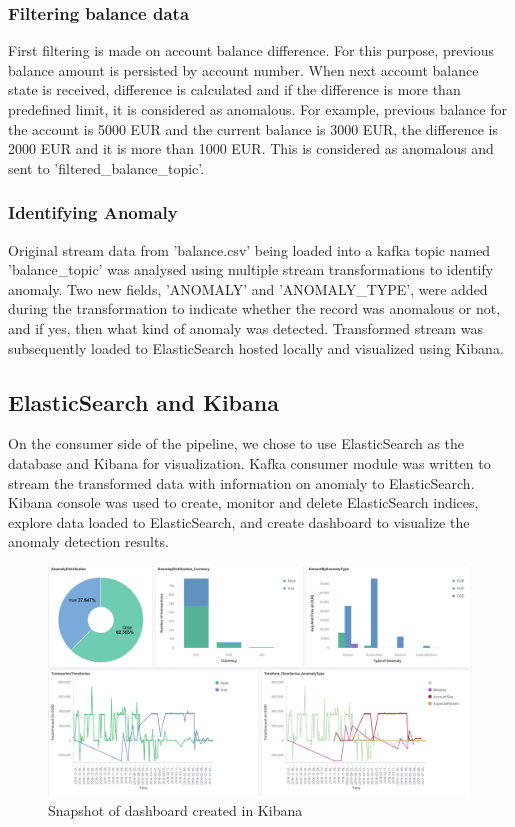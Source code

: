 \documentclass{article}
\begin{document}
\subsubsection{Filtering balance data}

First filtering is made on account balance difference. For this purpose, previous balance amount is persisted by account number. When next account balance state is received, difference is calculated and if the difference is more than predefined limit, it is considered as anomalous. For example, previous balance for the account is 5000 EUR and the current balance is 3000 EUR, the difference is 2000 EUR and it is more than 1000 EUR. This is considered as anomalous and sent to 'filtered\_balance\_topic'.

\subsubsection{Identifying Anomaly}

Original stream data from 'balance.csv' being loaded into a kafka topic named 'balance\_topic' was analysed using multiple stream transformations to identify anomaly. Two new fields, 'ANOMALY' and 'ANOMALY\_TYPE', were added during the transformation to indicate whether the record was anomalous or not, and if yes, then what kind of anomaly was detected. Transformed stream was subsequently loaded to ElasticSearch hosted locally and visualized using Kibana. 

\subsection{ElasticSearch and Kibana}

On the consumer side of the pipeline, we chose to use ElasticSearch as the database and Kibana for visualization. Kafka consumer module was written to stream the transformed data with information on anomaly to ElasticSearch. Kibana console was used to create, monitor and delete ElasticSearch indices, explore data loaded to ElasticSearch, and create dashboard to visualize the anomaly detection results.

\begin{figure}[h!]
\centering
\includegraphics[width=\textwidth]{Dashboard_snapshot.PNG}
\caption{Snapshot of dashboard created in Kibana}
\label{fig:OuptutDashboard}
\end{figure}
\end{document}
